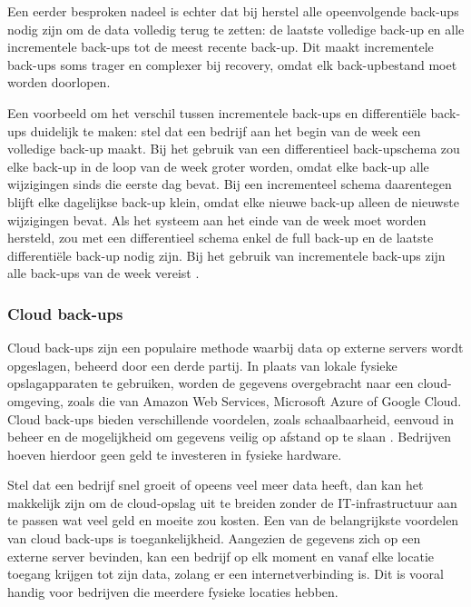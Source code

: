 Een eerder besproken nadeel is echter dat bij herstel alle opeenvolgende back-ups nodig zijn om de data volledig terug te zetten: de laatste volledige back-up en alle incrementele back-ups tot de meest recente back-up. Dit maakt incrementele back-ups soms trager en complexer bij recovery, omdat elk back-upbestand moet worden doorlopen. 

Een voorbeeld om het verschil tussen incrementele back-ups en differentiële back-ups duidelijk te maken: stel dat een bedrijf aan het begin van de week een volledige back-up maakt. Bij het gebruik van een differentieel back-upschema zou elke back-up in de loop van de week groter worden, omdat elke back-up alle wijzigingen sinds die eerste dag bevat. Bij een incrementeel schema daarentegen blijft elke dagelijkse back-up klein, omdat elke nieuwe back-up alleen de nieuwste wijzigingen bevat. Als het systeem aan het einde van de week moet worden hersteld, zou met een differentieel schema enkel de full back-up en de laatste differentiële back-up nodig zijn. Bij het gebruik van incrementele back-ups zijn alle back-ups van de week vereist \autocite{Beard2018}.

\subsubsection{Cloud back-ups}
Cloud back-ups zijn een populaire methode waarbij data op externe servers wordt opgeslagen, beheerd door een derde partij. In plaats van lokale fysieke opslagapparaten te gebruiken, worden de gegevens overgebracht naar een cloud-omgeving, zoals die van Amazon Web Services, Microsoft Azure of Google Cloud. Cloud back-ups bieden verschillende voordelen, zoals schaalbaarheid, eenvoud in beheer en de mogelijkheid om gegevens veilig op afstand op te slaan \autocite{Rahumed2011}. Bedrijven hoeven hierdoor geen geld te investeren in fysieke hardware. 

Stel dat een bedrijf snel groeit of opeens veel meer data heeft, dan kan het makkelijk zijn om de cloud-opslag uit te breiden zonder de IT-infrastructuur aan te passen wat veel geld en moeite zou kosten. Een van de belangrijkste voordelen van cloud back-ups is toegankelijkheid. Aangezien de gegevens zich op een externe server bevinden, kan een bedrijf op elk moment en vanaf elke locatie toegang krijgen tot zijn data, zolang er een internetverbinding is. Dit is vooral handig voor bedrijven die meerdere fysieke locaties hebben. 

